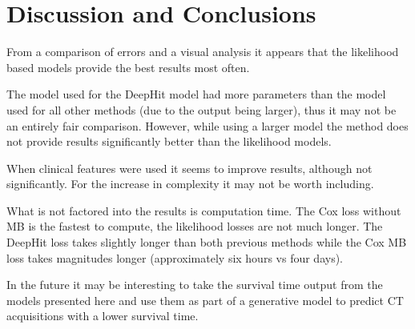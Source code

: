     \section{Discussion and Conclusions} \label{sec:deep_learning_for_ct_based_survival_analysis_of_idiopathic_pulmonary_fibrosis_patients_appendix_discussion_and_conclusions}
        From a comparison of errors and a visual analysis it appears that the likelihood based models provide the best results most often.
        
        The model used for the DeepHit model had more parameters than the model used for all other methods (due to the output being larger), thus it may not be an entirely fair comparison. However, while using a larger model the method does not provide results significantly better than the likelihood models.
        
        When clinical features were used it seems to improve results, although not significantly. For the increase in complexity it may not be worth including.
        
        What is not factored into the results is computation time. The Cox loss without \gls{MB} is the fastest to compute, the likelihood losses are not much longer. The DeepHit loss takes slightly longer than both previous methods while the Cox \gls{MB} loss takes magnitudes longer (approximately six hours vs four days).
    
        In the future it may be interesting to take the survival time output from the models presented here and use them as part of a generative model to predict \gls{CT} acquisitions with a lower survival time.
    